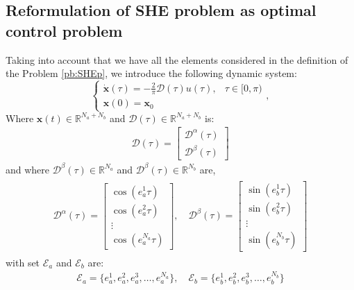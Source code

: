 \subsection{Reformulation of SHE problem as optimal control problem}

Taking into account that we have all the elements considered in the definition of the Problem \ref{pb:SHEp}, we introduce the following dynamic system:
\begin{equation}\label{eq:CauchyReversed}
    \begin{cases}
        \displaystyle\dot{\bm{x}}(\tau) = -\frac 2\pi\bm{\mathcal{D}}(\tau)u(\tau),  & \tau \in [0,\pi)
        \\[6pt]
        \bm{x}(0) = \bm{x}_0
    \end{cases},
\end{equation}
Where $\bm{x}(t) \in \mathbb{R}^{N_a + N_b}$ and $\bm{\mathcal{D}}(\tau) \in  \mathbb{R}^{N_a + N_b}$ is:
\begin{align*}
	\bm{\mathcal{D}}(\tau) = \begin{bmatrix} \bm{\mathcal{D}}^\alpha(\tau) \\ \bm{\mathcal{D}}^\beta(\tau) \end{bmatrix}     
\end{align*}
and where $\bm{\mathcal{D}}^\beta(\tau) \in \mathbb{R}^{N_a} $ and $ \bm{\mathcal{D}}^\beta(\tau) \in \mathbb{R}^{N_b}$ are,
\begin{gather}\label{eq:DalphaDbeta}
    \begin{align}
        \bm{\mathcal{D}}^\alpha(\tau) = 
        \begin{bmatrix} 
            \cos(e_a^1\tau) \\ \cos(e_a^2\tau) \\ \vdots \\ \cos(e_a^{N_a}\tau) 
        \end{bmatrix},
        \quad \bm{\mathcal{D}}^\beta(\tau) = 
        \begin{bmatrix} 
            \sin(e_b^1\tau) \\ \sin(e_b^2\tau) \\ \vdots \\ \sin(e_b^{N_b}\tau) 
        \end{bmatrix} 
    \end{align} 
\end{gather}
with set $\mathcal{E}_a$ and  $\mathcal{E}_b$ are:
\begin{align*}
	\mathcal{E}_a = \{e_a^1,e_a^2,e_a^3,\dots,e_a^{N_a}\}, \quad \mathcal{E}_b = \{e_b^1,e_b^2,e_b^3,\dots,e_b^{N_b}\}    
\end{align*}
